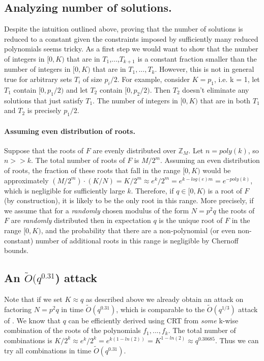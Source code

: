 \documentclass[letterpaper,twocolumn,10pt]{article}
\begin{document}
\subsection{Analyzing number of solutions.} Despite the intuition outlined above, proving that the number of solutions is reduced to a constant given the constraints imposed by sufficiently many reduced polynomials seems tricky.  As a first step we would want to show that the number of integers in $[0,K)$ that are in $T_1$,...,$T_{k+1}$ is a constant fraction smaller than the number of integers in $[0,K)$ that are in $T_1,...,T_k$. However, this is not in general true for arbitrary sets $T_i$ of size $p_i/2$. For example, consider $K = p_1$, i.e. k = 1, let $T_1$ contain $[0, p_1/2)$ and let $T_2$ contain $[0, p_2/2)$. Then $T_2$ doesn't eliminate any solutions that just satisfy $T_1$. The number of integers in $[0,K)$ that are in both $T_1$ and $T_2$ is precisely $p_1/2$. 

\paragraph{Assuming even distribution of roots.} Suppose that the roots of $F$ are evenly distributed over $\mathbb{Z}_M$. Let $n = poly(k)$, so $n >> k$. The total number of roots of $F$ is $M/2^m$. Assuming an even distribution of roots, the fraction of these roots that fall in the range $[0,K)$ would be approximately $(M/2^m) \cdot (K/N) = K/2^m \approx e^k/2^m = e^{k - log(e)m} = e^{-poly(k)}$, which is negligible for sufficiently large $k$. Therefore, if $q \in [0, K)$ is a root of $F$ (by construction), it is likely to be the only root in this range. More precisely, if we assume that for a \emph{randomly} chosen modulus of the form $N = p^2 q$ the roots of $F$ are \emph{randomly} distributed then in expectation $q$ is the unique root of $F$ in the range $[0, K)$, and the probability that there are a non-polynomial (or even non-constant) number of additional roots in this range is negligible by Chernoff bounds. 

\subsection{An $\tilde{O}(q^{0.31}$) attack} Note that if we set $K \approx q$ as described above we already obtain an attack on factoring $N = p^2 q$ in time $\tilde{O}(q^{0.31})$, which is comparable to the $\tilde{O}(q^{1/3})$ attack of \cite{dan}. We know that $q$ can be efficiently derived using CRT from \emph{some} k-wise combination of the roots of the polynomials $f_1,...,f_k$. 
The total number of combinations is $K/2^k \approx e^k / 2^k = e^{k(1 - ln(2))} = K^{1 - ln(2)} \approx q^{0.30685}$. Thus we can try all combinations in time $\tilde{O}(q^{0.31})$. 
\end{document}
